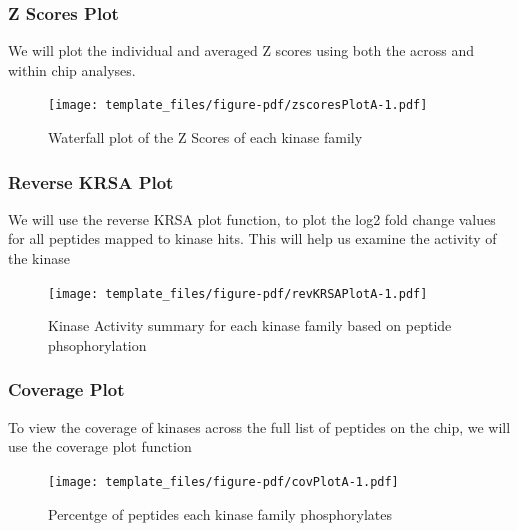 \documentclass[
  letterpaper,
  DIV=11,
  numbers=noendperiod]{scrreport}
\begin{document}
\hypertarget{z-scores-plot}{%
\subsubsection{Z Scores Plot}\label{z-scores-plot}}

We will plot the individual and averaged Z scores using both the across
and within chip analyses.

\begin{figure}[htbp]

{\centering \texttt{[image: template\_files/figure-pdf/zscoresPlotA-1.pdf]}

}

\caption{Waterfall plot of the Z Scores of each kinase family}

\end{figure}

\hypertarget{reverse-krsa-plot}{%
\subsubsection{Reverse KRSA Plot}\label{reverse-krsa-plot}}

We will use the reverse KRSA plot function, to plot the log2 fold change
values for all peptides mapped to kinase hits. This will help us examine
the activity of the kinase

\begin{figure}[htbp]

{\centering \texttt{[image: template\_files/figure-pdf/revKRSAPlotA-1.pdf]}

}

\caption{Kinase Activity summary for each kinase family based on peptide
phsophorylation}

\end{figure}

\hypertarget{coverage-plot}{%
\subsubsection{Coverage Plot}\label{coverage-plot}}

To view the coverage of kinases across the full list of peptides on the
chip, we will use the coverage plot function

\begin{figure}[htbp]

{\centering \texttt{[image: template\_files/figure-pdf/covPlotA-1.pdf]}

}

\caption{Percentge of peptides each kinase family phosphorylates}

\end{figure}
\end{document}
